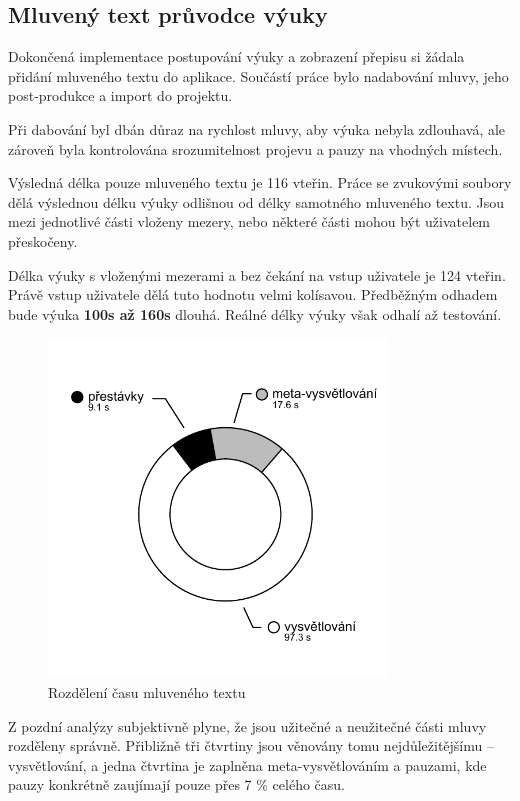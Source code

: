 \subsection{Mluvený text průvodce
výuky}\label{mluvenuxfd-text-prux16fvodce-vuxfduky}

Dokončená implementace postupování výuky a zobrazení přepisu si žádala
přidání mluveného textu do aplikace. Součástí práce bylo nadabování
mluvy, jeho post-produkce a import do projektu.

Při dabování byl dbán důraz na rychlost mluvy, aby výuka nebyla
zdlouhavá, ale zároveň byla kontrolována srozumitelnost projevu a pauzy
na vhodných místech.

Výsledná délka pouze mluveného textu je 116 vteřin. Práce se zvukovými
soubory dělá výslednou délku výuky odlišnou od délky samotného mluveného
textu. Jsou mezi jednotlivé části vloženy mezery, nebo některé části
mohou být uživatelem přeskočeny. 

Délka výuky s vloženými mezerami a bez
čekání na vstup uživatele je 124 vteřin. Právě vstup uživatele dělá tuto
hodnotu velmi kolísavou. Předběžným odhadem bude výuka \textbf{100s až
160s} dlouhá. Reálné délky výuky však odhalí až testování.

\begin{figure}[h!]
\centering
\includegraphics[height=9cm]{src/assets/time-chart.pdf}
\caption{Rozdělení času mluveného textu}
\end{figure}

Z pozdní analýzy subjektivně plyne, že jsou užitečné a neužitečné
části mluvy rozděleny správně. Přibližně tři čtvrtiny jsou věnovány
tomu nejdůležitějšímu -- vysvětlování, a jedna čtvrtina je zaplněna
meta-vysvětlováním a pauzami, kde pauzy konkrétně zaujímají pouze přes 7
\% celého času.


